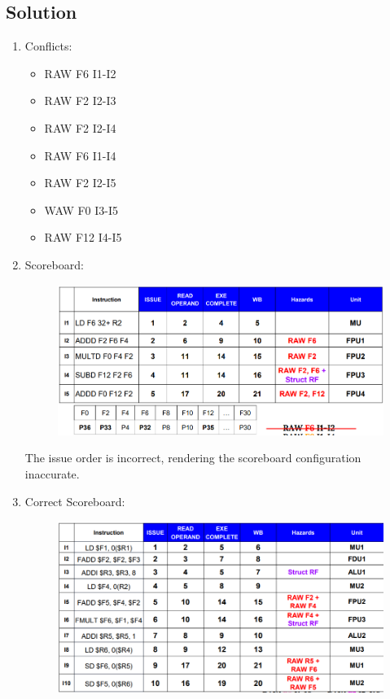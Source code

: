 \subsection*{Solution}
\begin{enumerate}
    \item Conflicts:
        \begin{itemize}
            \item RAW F6 I1-I2
            \item RAW F2 I2-I3
            \item RAW F2 I2-I4
            \item RAW F6 I1-I4
            \item RAW F2 I2-I5
            \item WAW F0 I3-I5
            \item RAW F12 I4-I5
        \end{itemize}
    \item Scoreboard:
        \begin{figure}[H]
            \centering
            \includegraphics[width=1\linewidth]{images/tom3.png}
        \end{figure}
        The issue order is incorrect, rendering the scoreboard configuration inaccurate.
    \item Correct Scoreboard:
        \begin{figure}[H]
            \centering
            \includegraphics[width=1\linewidth]{images/score3.png}
        \end{figure}
\end{enumerate}
